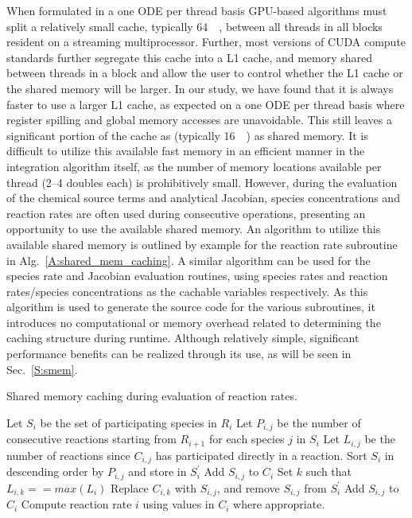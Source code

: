 \documentclass[preprint]{elsarticle}
\begin{document}
When formulated in a one ODE per thread basis GPU-based algorithms must split a relatively small cache, typically \SI{64}{\kilo\byte}, between all threads in all blocks resident on a streaming multiprocessor.
Further, most versions of CUDA compute standards further segregate this cache into a L1 cache, and memory shared between threads in a block and allow the user to control whether the L1 cache or the shared memory will be larger.
In our study, we have found that it is always faster to use a larger L1 cache, as expected on a one ODE per thread basis where register spilling and global memory accesses are unavoidable.
This still leaves a significant portion of the cache as (typically \SI{16}{\kilo\byte}) as shared memory.
It is difficult to utilize this available fast memory in an efficient manner in the integration algorithm itself, as the number of memory locations available per thread (2--4 doubles each) is prohibitively small.
However, during the evaluation of the chemical source terms and analytical Jacobian, species concentrations and reaction rates are often used during consecutive operations, presenting an opportunity to use the available shared memory.
An algorithm to utilize this available shared memory is outlined by example for the reaction rate subroutine in Alg.~\ref{A:shared_mem_caching}.
A similar algorithm can be used for the species rate and Jacobian evaluation routines, using species rates and reaction rates\slash species concentrations as the cachable variables respectively.
As this algorithm is used to generate the source code for the various subroutines, it introduces no computational or memory overhead related to determining the caching structure during runtime.
Although relatively simple, significant performance benefits can be realized through its use, as will be seen in Sec.~\ref{S:smem}.

\begin{algorithm}[h]
\caption{Shared memory caching during evaluation of reaction rates.}
\begin{algorithmic}[0]
    \State Let $S_i$ be the set of participating species in $R_i$
    \State Let $P_{i,j}$ be the number of consecutive reactions starting from $R_{i + 1}$ for each species $j$ in $S_i$
    \State Let $L_{i,j}$ be the number of reactions since $C_{i,j}$ has participated directly in a reaction.
    \State Sort $S_{i}$ in descending order by $P_{i,j}$ and store in $S_{i}^{\prime}$
	\State Add $S_{i,j}$ to $C_i$
	  \State Set $k$ such that $L_{i,k} == max\left(L_{i}\right)$
	  \State Replace $C_{i,k}$ with $S_{i,j}$, and remove $S_{i,j}$ from $S_{i}^{\prime}$
      \EndIf
    \EndFor
	\State Add $S_{i,j}$ to $C_i$
      \EndIf
    \EndFor
    \State Compute reaction rate $i$ using values in $C_i$ where appropriate.
  \EndFor
\end{algorithmic}
\label{A:shared_mem_caching}
\end{algorithm}
\end{document}
